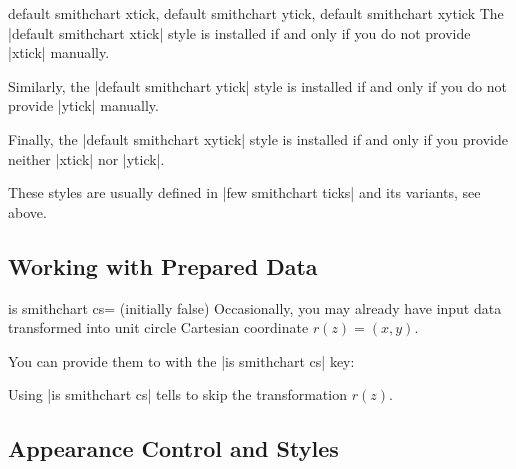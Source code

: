 \begin{pgfplotskeylist}{%
    default smithchart xtick,
    default smithchart ytick,
    default smithchart xytick%
}
    The |default smithchart xtick| style is installed if and only if you do not
    provide |xtick| manually.

    Similarly, the |default smithchart ytick| style is installed if and only if
    you do not provide |ytick| manually.

    Finally, the |default smithchart xytick| style is installed if and only if
    you provide neither |xtick| nor |ytick|.

    These styles are usually defined in |few smithchart ticks| and its
    variants, see above.
\end{pgfplotskeylist}


\subsection{Working with Prepared Data}

\begin{pgfplotskey}{is smithchart cs= (initially false)}
    Occasionally, you may already have input data transformed into unit circle
    Cartesian coordinate $r(z) = (x,y)$.

    You can provide them to \PGFPlots{} with the |is smithchart cs| key:
\begin{codeexample}[]
\end{codeexample}
    Using |is smithchart cs| tells \PGFPlots{} to skip the transformation
    $r(z)$.
\end{pgfplotskey}


\subsection{Appearance Control and Styles}

